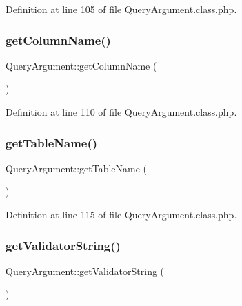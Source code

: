 Definition at line 105 of file Query\+Argument.\+class.\+php.

\mbox{\label{classQueryArgument_aa0ee6b3b56a5c9de48fe073f84f818bc}} 
\subsubsection{\texorpdfstring{get\+Column\+Name()}{getColumnName()}}
{\footnotesize\ttfamily Query\+Argument\+::get\+Column\+Name (\begin{DoxyParamCaption}{ }\end{DoxyParamCaption})}



Definition at line 110 of file Query\+Argument.\+class.\+php.

\mbox{\label{classQueryArgument_a0cd81646f06d0b3d8ed92977498fd7aa}} 
\subsubsection{\texorpdfstring{get\+Table\+Name()}{getTableName()}}
{\footnotesize\ttfamily Query\+Argument\+::get\+Table\+Name (\begin{DoxyParamCaption}{ }\end{DoxyParamCaption})}



Definition at line 115 of file Query\+Argument.\+class.\+php.

\mbox{\label{classQueryArgument_a457e607f0cc0ec072e00f0bc5c3898fd}} 
\subsubsection{\texorpdfstring{get\+Validator\+String()}{getValidatorString()}}
{\footnotesize\ttfamily Query\+Argument\+::get\+Validator\+String (\begin{DoxyParamCaption}{ }\end{DoxyParamCaption})}



